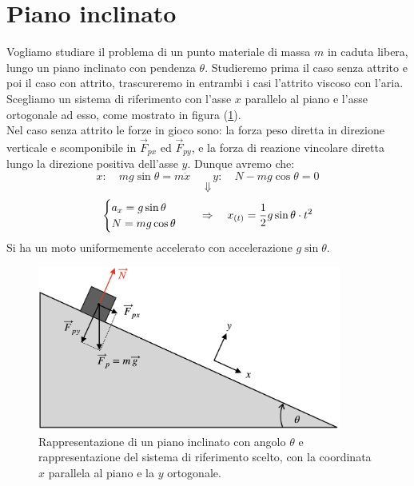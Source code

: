 \section{Piano inclinato}
Vogliamo studiare il problema di un punto materiale di massa $m$ in caduta
libera, lungo un piano inclinato con pendenza $\theta$. Studieremo prima il
caso senza attrito e poi il caso con attrito, trascureremo in entrambi i
casi l'attrito viscoso con l'aria. \\
Scegliamo un sistema di riferimento con l'asse $x$ parallelo al piano e
l'asse ortogonale ad esso, come mostrato in figura (\ref{fig:Iplain&pendulum:Iplain}).
\\ Nel caso senza attrito le forze in gioco sono: la forza peso diretta in
direzione verticale e scomponibile in $\vec F_{px}$ ed $\vec F_{py}$, e la
forza di reazione vincolare diretta lungo la direzione positiva dell'asse $y$.
Dunque avremo che:
\begin{equation}
    x:\quad mg\sin\theta = m\ddot x\quad\quad y: \quad N - mg\cos\theta = 0
\end{equation}
$$\Downarrow$$
\begin{equation}
    \begin{cases}
        a_x = g\sin\theta\\
        N = mg\cos\theta
    \end{cases}
    \quad\Rightarrow\quad x_{(t)} = \frac12 g\sin\theta\cdot t^2
\end{equation}
Si ha un moto uniformemente accelerato con accelerazione $g\sin\theta$.
\begin{figure}[htbp]
    \begin{center}
        \includegraphics[width=10cm]{images/pianoincl.png}
        \caption{Rappresentazione di un piano inclinato con angolo $\theta$ e
        rappresentazione del sistema di riferimento scelto, con la coordinata $x$
        parallela al piano e la $y$ ortogonale.}
\end{center}
\label{fig:Iplain&pendulum:Iplain}
\end{figure}
